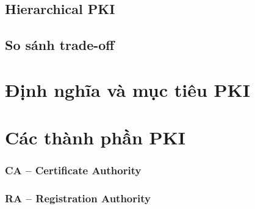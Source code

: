 \subsection{Hierarchical PKI}

\subsection{So sánh trade-off}


\section{Định nghĩa và mục tiêu PKI}
\label{sec:3.2}


\section{Các thành phần PKI}
\label{sec:3.3}

\subsubsection*{CA -- Certificate Authority}

\subsubsection*{RA -- Registration Authority}

